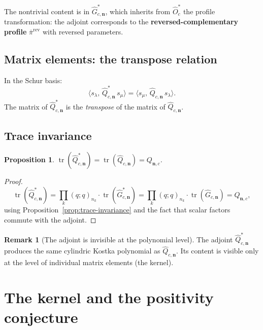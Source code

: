 \documentclass[11pt]{article}
\newcommand{\qpochn}[3]{(#1;#2)_{#3}}
\DeclareMathOperator{\tr}{tr}
\theoremstyle{plain}
\newtheorem{proposition}[theorem]{Proposition}
\theoremstyle{definition}
\newtheorem{remark}[theorem]{Remark}
\begin{document}
The nontrivial content is in $\hat{G}_{c,\mathbf{n}}^*$, which
inherits from $\hat{O}_c^*$ the profile transformation: the adjoint
corresponds to the \textbf{reversed-complementary profile}
$\bar\pi^{\mathrm{rev}}$ with reversed parameters.

\subsection{Matrix elements: the transpose relation}

In the Schur basis:
\begin{equation}\label{eq:Q-adj-matrix}
  \langle s_\lambda,\, \hat{Q}_{c,\mathbf{n}}^*\, s_\mu \rangle
  = \langle s_\mu,\, \hat{Q}_{c,\mathbf{n}}\, s_\lambda \rangle.
\end{equation}
The matrix of $\hat{Q}_{c,\mathbf{n}}^*$ is the \emph{transpose}
of the matrix of $\hat{Q}_{c,\mathbf{n}}$.

\subsection{Trace invariance}

\begin{proposition}
\label{prop:Q-trace-invariance}
$\tr(\hat{Q}_{c,\mathbf{n}}^*) = \tr(\hat{Q}_{c,\mathbf{n}})
= Q_{\mathbf{n},c}$.
\end{proposition}

\begin{proof}
\[
  \tr(\hat{Q}_{c,\mathbf{n}}^*)
  = \prod_k \qpochn{q}{q}{n_k} \cdot \tr(\hat{G}_{c,\mathbf{n}}^*)
  = \prod_k \qpochn{q}{q}{n_k} \cdot \tr(\hat{G}_{c,\mathbf{n}})
  = Q_{\mathbf{n},c},
\]
using Proposition~\ref{prop:trace-invariance} and the fact that
scalar factors commute with the adjoint.
\end{proof}

\begin{remark}[The adjoint is invisible at the polynomial level]
The adjoint $\hat{Q}^*_{c,\mathbf{n}}$ produces the same
cylindric Kostka polynomial as $\hat{Q}_{c,\mathbf{n}}$.
Its content is visible only at the level of individual matrix
elements (the kernel).
\end{remark}


\section{The kernel and the positivity conjecture}
\label{sec:kernel}
\end{document}
